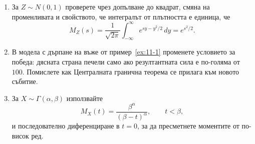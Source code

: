 \begin{enumerate}
    \item За $Z \sim N(0,1)$ проверете чрез допълване до квадрат, смяна на променливата и свойството, че интегралът от плътността е единица, че
    \[
    M_Z(s)=\frac{1}{\sqrt{2\pi}}\int_{-\infty}^{\infty}e^{sy-y^2/2}\,dy=e^{s^2/2}.
    \]

    \item В модела с дърпане на въже от пример~\ref{ex:11-1} променете условието за победа: дясната страна печели само ако резултантната сила е по-голяма от $100$. Помислете как Централната гранична теорема се прилага към новото събитие.

    \item За $X\sim\Gamma(\alpha,\beta)$ използвайте
    \[
    M_X(t)=\frac{\beta^\alpha}{(\beta-t)^\alpha},\qquad t<\beta,
    \]
    и последователно диференциране в $t=0$, за да пресметнете моментите от по-висок ред.
\end{enumerate}
